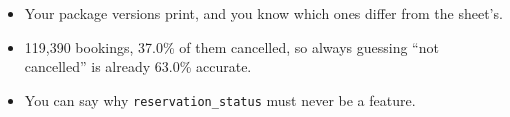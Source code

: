 \begin{labcheckpoint}
\begin{itemize}[leftmargin=1.2em,itemsep=2pt,topsep=1pt]
  \item Your package versions print, and you know which ones differ from the sheet's.
  \item 119,390 bookings, 37.0\% of them cancelled, so always guessing ``not cancelled'' is already 63.0\% accurate.
  \item You can say why \texttt{reservation\_status} must never be a feature.
\end{itemize}
\end{labcheckpoint}


